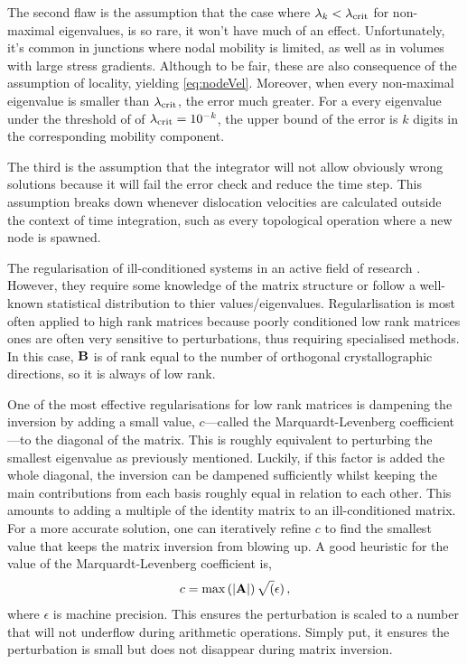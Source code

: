 The second flaw is the assumption that the case where $\lambda_k < \lambda_{\textrm{crit}}$ for non-maximal eigenvalues, is so rare, it won't have much of an effect. Unfortunately, it's common in junctions where nodal mobility is limited, as well as in volumes with large stress gradients. Although to be fair, these are also consequence of the assumption of locality, yielding \cref{eq:nodeVel}. Moreover, when every non-maximal eigenvalue is smaller than $\lambda_{\textrm{crit}}$, the error much greater. For a every eigenvalue under the threshold of of $\lambda_{\textrm{crit}} = 10^{-k}$, the upper bound of the error is $k$ digits in the corresponding mobility component.

The third is the assumption that the integrator will not allow obviously wrong solutions because it will fail the error check and reduce the time step. This assumption breaks down whenever dislocation velocities are calculated outside the context of time integration, such as every topological operation where a new node is spawned.

The regularisation of ill-conditioned systems in an active field of research \cite{regularisation1,regularisation2,regularisation3}. However, they require some knowledge of the matrix structure or follow a well-known statistical distribution to thier values/eigenvalues. Regularlisation is most often applied to high rank matrices because poorly conditioned low rank matrices ones are often very sensitive to perturbations, thus requiring specialised methods. In this case, $\mathbf{B}$ is of rank equal to the number of orthogonal crystallographic directions, so it is always of low rank.

One of the most effective regularisations for low rank matrices is dampening the inversion by adding a small value, $c$---called the Marquardt-Levenberg coefficient---to the diagonal of the matrix. This is roughly equivalent to perturbing the smallest eigenvalue as previously mentioned. Luckily, if this factor is added the whole diagonal, the inversion can be dampened sufficiently whilst keeping the main contributions from each basis roughly equal in relation to each other. This amounts to adding a multiple of the identity matrix to an ill-conditioned matrix. For a more accurate solution, one can iteratively refine $c$ to find the smallest value that keeps the matrix inversion from blowing up. A good heuristic for the value of the Marquardt-Levenberg coefficient is,
\begin{align}\label{eq:marquardt}
    c = \max\left(\lvert\mathbf{A}\rvert\right) \sqrt(\epsilon)\,,
\end{align}
where $\epsilon$ is machine precision. This ensures the perturbation is scaled to a number that will not underflow during arithmetic operations. Simply put, it ensures the perturbation is small but does not disappear during matrix inversion.

